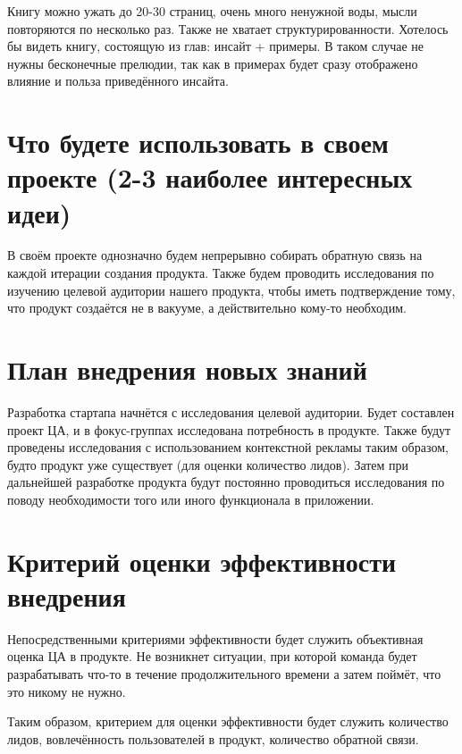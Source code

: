 \documentclass[a4paper,8pt]{article}
\begin{document}
Книгу можно ужать до 20-30 страниц, очень много ненужной воды, мысли повторяются по несколько раз. Также не хватает структурированности. Хотелось бы видеть книгу, состоящую из глав: инсайт + примеры. В таком случае не нужны бесконечные прелюдии, так как в примерах будет сразу отображено влияние и польза приведённого инсайта.


\section{Что будете использовать в своем проекте (2-3 наиболее интересных идеи)}

В своём проекте однозначно будем непрерывно собирать обратную связь на каждой итерации создания продукта. Также будем проводить исследования по изучению целевой аудитории нашего продукта, чтобы иметь подтверждение тому, что продукт создаётся не в вакууме, а действительно кому-то необходим.


\section{План внедрения новых знаний}

Разработка стартапа начнётся с исследования целевой аудитории. Будет составлен проект ЦА, и в фокус-группах исследована потребность в продукте. Также будут проведены исследования с использованием контекстной рекламы таким образом, будто продукт уже существует (для оценки количество лидов). Затем при дальнейшей разработке продукта будут постоянно проводиться исследования по поводу необходимости того или иного функционала в приложении.


\section{Критерий оценки эффективности внедрения}

Непосредственными критериями эффективности будет служить объективная оценка ЦА в продукте. Не возникнет ситуации, при которой команда будет разрабатывать что-то в течение продолжительного времени а затем поймёт, что это никому не нужно.

Таким образом, критерием для оценки эффективности будет служить количество лидов, вовлечённость пользователей в продукт, количество обратной связи.
\end{document}
